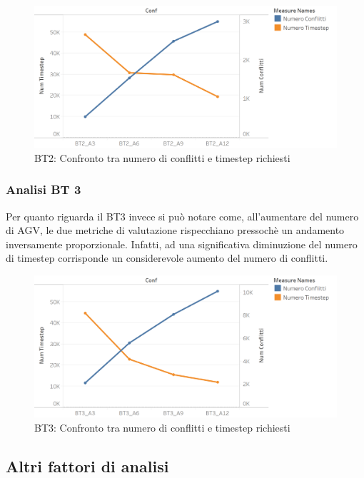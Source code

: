 \documentclass[12pt]{article}
\begin{document}
\begin{figure}[H]
\centering
  \includegraphics[width=1\linewidth]{Figures/Results_Graphics/BT2_TimeConflicts.png}
  \caption{BT2: Confronto tra numero di conflitti e timestep richiesti}\label{fig:BT2_TimeConflicts}
\end{figure}

\subsubsection{Analisi BT 3}
Per quanto riguarda il BT3 invece si può notare come, all'aumentare del numero di AGV, le due metriche di valutazione rispecchiano pressochè un andamento inversamente proporzionale. Infatti, ad una significativa diminuzione del numero di timestep corrisponde un considerevole aumento del numero di conflitti.
\begin{figure}[H]
\centering
  \includegraphics[width=1\linewidth]{Figures/Results_Graphics/BT3_TimeConflicts.png}
  \caption{BT3: Confronto tra numero di conflitti e timestep richiesti}\label{fig:BT3_TimeConflicts}
\end{figure}

\newpage
\subsection{Altri fattori di analisi}
\end{document}
